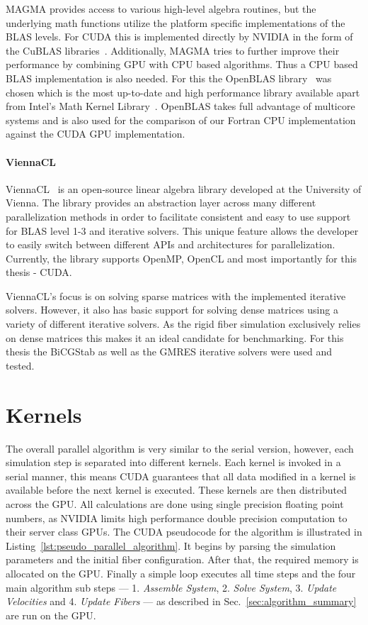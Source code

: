 MAGMA provides access to various high-level algebra routines, but the underlying math functions utilize the platform specific implementations of the BLAS levels. For CUDA this is implemented directly by NVIDIA in the form of the CuBLAS libraries~\cite{CuBLAS}. Additionally, MAGMA tries to further improve their performance by combining GPU with CPU based algorithms. Thus a CPU based BLAS implementation is also needed. For this the OpenBLAS library~\cite{OpenBLAS} was chosen which is the most up-to-date and high performance library available apart from Intel's Math Kernel Library~\cite{IntelMKL}. OpenBLAS takes full advantage of multicore systems and is also used for the comparison of our Fortran CPU implementation against the CUDA GPU implementation.

\paragraph{ViennaCL}
ViennaCL~\cite{ViennaCLDocumentation} is an open-source linear algebra library developed at the University of Vienna. The library provides an abstraction layer across many different parallelization methods in order to facilitate consistent and easy to use support for BLAS level 1-3 and iterative solvers. This unique feature allows the developer to easily switch between different APIs and architectures for parallelization. Currently, the library supports OpenMP, OpenCL and most importantly for this thesis - CUDA.

ViennaCL's focus is on solving sparse matrices with the implemented iterative solvers. However, it also has basic support for solving dense matrices using a variety of different iterative solvers. As the rigid fiber simulation exclusively relies on dense matrices this makes it an ideal candidate for benchmarking. For this thesis the BiCGStab as well as the GMRES iterative solvers were used and tested.

\section{Kernels}
\label{sec:kernels}

The overall parallel algorithm is very similar to the serial version, however, each simulation step is separated into different kernels. Each kernel is invoked in a serial manner, this means CUDA guarantees that all data modified in a kernel is available before the next kernel is executed. These kernels are then distributed across the GPU. All calculations are done using single precision floating point numbers, as NVIDIA limits high performance double precision computation to their server class GPUs. The CUDA pseudocode for the algorithm is illustrated in Listing~\ref{lst:pseudo_parallel_algorithm}. It begins by parsing the simulation parameters and the initial fiber configuration. After that, the required memory is allocated on the GPU. Finally a simple loop executes all time steps and the four main algorithm sub steps — 1. \emph{Assemble System}, 2. \emph{Solve System}, 3. \emph{Update Velocities} and 4. \emph{Update Fibers} — as described in Sec.~\ref{sec:algorithm_summary} are run on the GPU.

